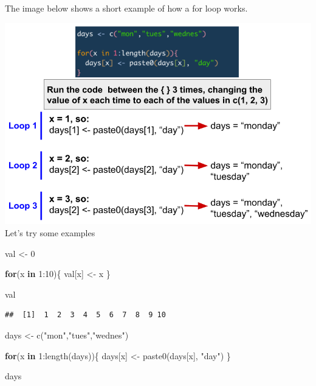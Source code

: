 \documentclass[
]{book}
\newenvironment{Shaded}{\begin{snugshade}}{\end{snugshade}}
\newcommand{\ControlFlowTok}[1]{\textcolor[rgb]{0.13,0.29,0.53}{\textbf{#1}}}
\newcommand{\DecValTok}[1]{\textcolor[rgb]{0.00,0.00,0.81}{#1}}
\newcommand{\FunctionTok}[1]{\textcolor[rgb]{0.00,0.00,0.00}{#1}}
\newcommand{\NormalTok}[1]{#1}
\newcommand{\OtherTok}[1]{\textcolor[rgb]{0.56,0.35,0.01}{#1}}
\newcommand{\SpecialCharTok}[1]{\textcolor[rgb]{0.00,0.00,0.00}{#1}}
\newcommand{\StringTok}[1]{\textcolor[rgb]{0.31,0.60,0.02}{#1}}
\begin{document}
The image below shows a short example of how a for loop works.

\includegraphics{images/for loop.png}
Let's try some examples

\begin{Shaded}
\begin{Highlighting}[]
\NormalTok{val }\OtherTok{\textless{}{-}} \DecValTok{0}

\ControlFlowTok{for}\NormalTok{(x }\ControlFlowTok{in} \DecValTok{1}\SpecialCharTok{:}\DecValTok{10}\NormalTok{)\{}
\NormalTok{  val[x] }\OtherTok{\textless{}{-}}\NormalTok{ x}
\NormalTok{\}}

\NormalTok{val}
\end{Highlighting}
\end{Shaded}

\begin{verbatim}
##  [1]  1  2  3  4  5  6  7  8  9 10
\end{verbatim}

\begin{Shaded}
\begin{Highlighting}[]
\NormalTok{days }\OtherTok{\textless{}{-}} \FunctionTok{c}\NormalTok{(}\StringTok{"mon"}\NormalTok{,}\StringTok{"tues"}\NormalTok{,}\StringTok{"wednes"}\NormalTok{)}

\ControlFlowTok{for}\NormalTok{(x }\ControlFlowTok{in} \DecValTok{1}\SpecialCharTok{:}\FunctionTok{length}\NormalTok{(days))\{}
\NormalTok{  days[x] }\OtherTok{\textless{}{-}} \FunctionTok{paste0}\NormalTok{(days[x], }\StringTok{"day"}\NormalTok{)}
\NormalTok{\}}

\NormalTok{days}
\end{Highlighting}
\end{Shaded}
\end{document}

